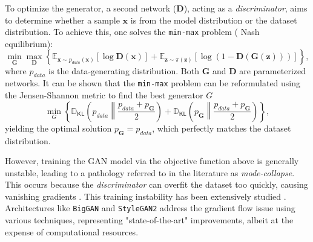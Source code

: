\documentclass[fleqn,usenatbib]{mnras}
\newcommand{\Esp}[0]{\ensuremath{\mathbb{E}}}
\newcommand{\DKL}[0]{\ensuremath{\mathbb{D}_{\mathsf{KL}}}}
\begin{document}
To optimize the generator, a second network ($\bm{D}$), acting as a \textit{discriminator}, aims to determine whether a sample $\bm{x}$ is from the model distribution or the dataset distribution. To achieve this, one solves the \texttt{min-max} problem ({\color{red} Nash equilibrium}):
\begin{equation}
\min_{\bm{G}} \max_{\bm{D}}\left\{ \Esp_{\bm{x}\sim p_{data}(\bm{x})}[\log \bm{D}(\bm{x})] + \Esp_{\bm{z}\sim \pi(\bm{z})}[\log(1-\bm{D}(\bm{G}(\bm{z})))] \right\},
\end{equation}
where $p_{data}$ is the data-generating distribution. Both $\bm{G}$ and $\bm{D}$ are parameterized networks. 
{\color{red}It can be shown that the \texttt{min-max} problem can be reformulated using the Jensen-Shannon metric to find the best generator $G$}
\begin{equation}
\min_G \left\{ \DKL{\left( p_{data} \left\| \frac{p_{data} + p_{\bm{G}}}{2}\right. \right)} + \DKL{\left(p_{\bm{G}} \left\| \frac{p_{data} + p_{\bm{G}}}{2} \right. \right)} \right\},
\end{equation}
yielding the optimal solution $p_{\bm{G}} = p_{data}$, which perfectly matches the dataset distribution.

However, training the GAN model via the objective function above is generally unstable, leading to a pathology referred to in the literature as \textit{mode-collapse}. This occurs because the \textit{discriminator} can overfit the dataset too quickly, causing vanishing gradients \citep{Gulrajani2017}. This training instability has been extensively studied \citep[see, e.g., reviews by][]{Saxena2021,Jozdani2022}. Architectures like \texttt{BigGAN} \citep{Brock2019} and \texttt{StyleGAN2} \citep{Karras2018ASG,Karras2020} address the gradient flow issue using various techniques, representing "state-of-the-art" improvements, albeit at the expense of computational resources.
\end{document}
